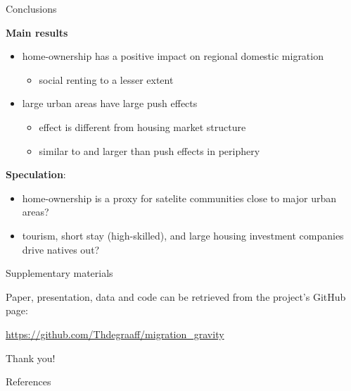 \documentclass{beamer}
\begin{document}
\begin{frame}{Conclusions}

\textbf{Main results}
\begin{itemize}
  \item home-ownership has a \alert{positive} impact on regional domestic migration
  \begin{itemize}
	\item social renting to a lesser extent
  \end{itemize}
  \item large urban areas have large \alert{push} effects
  \begin{itemize}
	\item effect is different from housing market structure 
	\item \alert{similar} to and \alert{larger} than push effects in periphery
  \end{itemize}
\end{itemize}

\textbf{Speculation}:
\begin{itemize}
  \item home-ownership is a proxy for satelite communities close to major urban areas?
  \item tourism, short stay (high-skilled), and large housing investment companies drive natives out?
\end{itemize}
\end{frame}

\begin{frame}{Supplementary materials}

Paper, presentation, data and code can be retrieved from the project's GitHub page: 

\begin{center}\url{https://github.com/Thdegraaff/migration\_gravity}\end{center}

\end{frame}

\begin{frame}[standout]
Thank you!
\end{frame}

\appendix

\begin{frame}[allowframebreaks]{References}

		\printbibliography[heading=none]

\end{frame}
\end{document}
